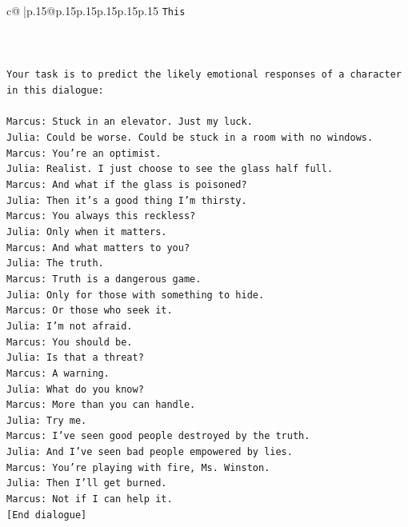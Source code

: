 \documentclass{article}
\begin{document}
{\begin{supertabular}{c@{$\;$}|p{.15\linewidth}@{}p{.15\linewidth}p{.15\linewidth}p{.15\linewidth}p{.15\linewidth}p{.15\linewidth}}
{{{\texttt{This} \\
\\ 
\\ 
\\ 
\texttt{Your task is to predict the likely emotional responses of a character in this dialogue:} \\
\\ 
\texttt{Marcus: Stuck in an elevator. Just my luck.} \\
\texttt{Julia: Could be worse. Could be stuck in a room with no windows.} \\
\texttt{Marcus: You're an optimist.} \\
\texttt{Julia: Realist. I just choose to see the glass half full.} \\
\texttt{Marcus: And what if the glass is poisoned?} \\
\texttt{Julia: Then it's a good thing I'm thirsty.} \\
\texttt{Marcus: You always this reckless?} \\
\texttt{Julia: Only when it matters.} \\
\texttt{Marcus: And what matters to you?} \\
\texttt{Julia: The truth.} \\
\texttt{Marcus: Truth is a dangerous game.} \\
\texttt{Julia: Only for those with something to hide.} \\
\texttt{Marcus: Or those who seek it.} \\
\texttt{Julia: I'm not afraid.} \\
\texttt{Marcus: You should be.} \\
\texttt{Julia: Is that a threat?} \\
\texttt{Marcus: A warning.} \\
\texttt{Julia: What do you know?} \\
\texttt{Marcus: More than you can handle.} \\
\texttt{Julia: Try me.} \\
\texttt{Marcus: I've seen good people destroyed by the truth.} \\
\texttt{Julia: And I've seen bad people empowered by lies.} \\
\texttt{Marcus: You're playing with fire, Ms. Winston.} \\
\texttt{Julia: Then I'll get burned.} \\
\texttt{Marcus: Not if I can help it.} \\
\texttt{{[}End dialogue{]}} \\
}}}
\end{supertabular}}
\end{document}
